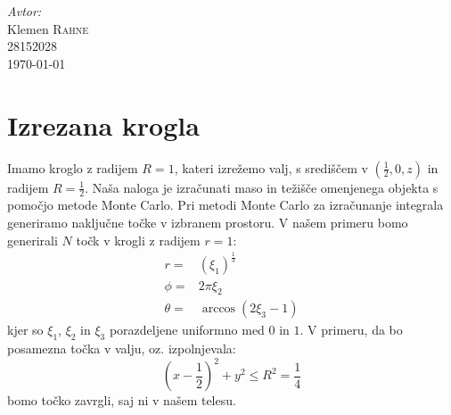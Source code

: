 \documentclass[slovene,11pt,a4paper]{article}
\numberwithin{equation}{section} %
\numberwithin{figure}{section} %
\numberwithin{table}{section} %
\begin{document}
\begin{titlepage}



\Large \emph{Avtor:}\\
Klemen \textsc{Rahne}\\
28152028\\[2cm]

{\large \today } \\[0.5cm] %

	

\end{titlepage}






\section{Izrezana krogla}
Imamo kroglo z radijem $R=1$, kateri izrežemo valj, s središčem v $(\frac{1}{2},0,z)$ in radijem $R=\frac{1}{2}$. Naša naloga je izračunati maso in težišče omenjenega objekta s pomočjo metode Monte Carlo. 
Pri metodi Monte Carlo za izračunanje integrala generiramo naključne točke v izbranem prostoru. V našem primeru bomo generirali $N$ točk v krogli z radijem $r=1$:
\begin{equation}
\begin{aligned}
r=& (\xi_1)^{\frac{1}{3}} \\
\phi=& 2 \pi \xi_2 \\
\theta = & \arccos(2 \xi_3 -1)
\end{aligned}
\end{equation}
kjer so $\xi_1$, $\xi_2$ in $\xi_3$ porazdeljene uniformno med $0$ in $1$. V primeru, da bo posamezna točka v valju, oz. izpolnjevala:
\begin{equation}
(x-\frac{1}{2})^2 +y^2 \leq R^2=\frac{1}{4}
\end{equation}
bomo točko zavrgli, saj ni v našem telesu.
\end{document}
